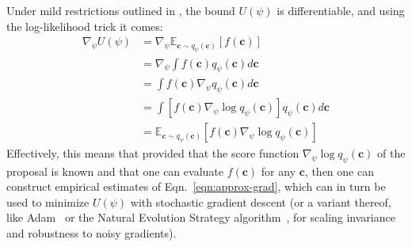 \documentclass[twocolumn,superscriptaddress,aps]{revtex4-1}
\theoremstyle{plain}
\begin{document}
Under mild restrictions outlined in  \citep{2012arXiv1212.4507S}, the bound $U(\psi)$ is differentiable, and using the log-likelihood trick it comes:
\begin{align}\label{eqn:approx-grad}
    \nabla_\psi U(\psi) &= \nabla_\psi \mathbb{E}_{\mathbf{c} \sim q_\psi(\mathbf{c})} [f(\mathbf{c})] \nonumber \\
    &= \nabla_\psi \int f(\mathbf{c})  q_\psi(\mathbf{c})  d\mathbf{c} \nonumber \\
    &= \int f(\mathbf{c}) \nabla_\psi q_\psi(\mathbf{c})  d\mathbf{c} \nonumber \\
    &= \int \left[ f(\mathbf{c}) \nabla_\psi \log q_\psi(\mathbf{c}) \right]  q_\psi(\mathbf{c})  d\mathbf{c} \nonumber \\
    &= \mathbb{E}_{\mathbf{c} \sim q_\psi(\mathbf{c})} [f(\mathbf{c}) \nabla_\psi \log q_\psi(\mathbf{c})]
\end{align}
Effectively, this means that provided that the score function $\nabla_\psi \log
q_\psi(\mathbf{c})$ of the proposal is known and that one can evaluate
$f(\mathbf{\mathbf{c}})$ for any $\mathbf{c}$, then one can construct empirical
estimates of Eqn.~\ref{eqn:approx-grad}, which can in turn be used to minimize
$U(\psi)$ with stochastic gradient descent (or a variant thereof, like
Adam~\cite{2014arXiv1412.6980K} or the Natural Evolution Strategy
algorithm~\citep{2011arXiv1106.4487W}, for scaling invariance and
robustness to noisy gradients).

\end{document}
